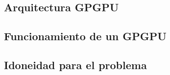 \subsection{Arquitectura GPGPU}

\subsection{Funcionamiento de un GPGPU}

\subsection{Idoneidad para el problema}

